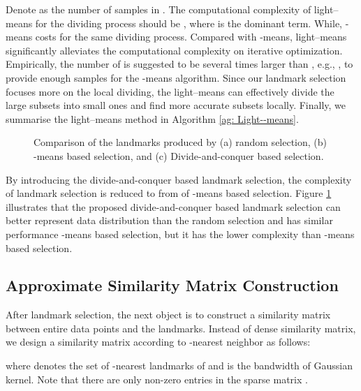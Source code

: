 \documentclass[a4paper,fleqn]{cas-dc}
\begin{document}
Denote  as the number of samples in .
The computational complexity of light--means for the dividing process  should be , where  is the dominant term.
While, -means costs  for the same dividing process.
Compared with -means, light--means significantly alleviates the computational complexity on iterative optimization.
Empirically, the number of  is suggested to be several times larger than , e.g., , to provide enough samples for the -means algorithm.
Since our landmark selection focuses more on the local dividing, the light--means can effectively divide the large subsets into small ones and find more accurate subsets locally.
Finally, we summarise the light--means method in Algorithm \ref{ag: Light--means}.



\begin{figure}[]
  \begin{center}
    {}
    {}
    {}
    \caption{Comparison of the landmarks produced by (a) random selection, (b) -means based selection, and (c) Divide-and-conquer based selection.}
    \label{fig:cmpSelStrategy_all3}
  \end{center}
\end{figure}

By introducing the divide-and-conquer based landmark selection, the complexity of landmark selection is reduced to  from  of -means based selection.
Figure \ref{fig:cmpSelStrategy_all3} illustrates that the proposed divide-and-conquer based landmark selection can better represent data distribution than the random selection and has similar performance -means based selection, but it has the lower complexity than -means based selection.


\subsection{Approximate Similarity Matrix Construction}
\label{sec:approx_similiarty}

After landmark selection, the next object is to construct a similarity matrix between entire data points and the landmarks.
Instead of dense similarity matrix, we design a similarity matrix  according to -nearest neighbor as follows: 

where  denotes the set of -nearest landmarks of  and  is the bandwidth of Gaussian kernel.
Note that there are only  non-zero entries in the sparse matrix .
\end{document}
